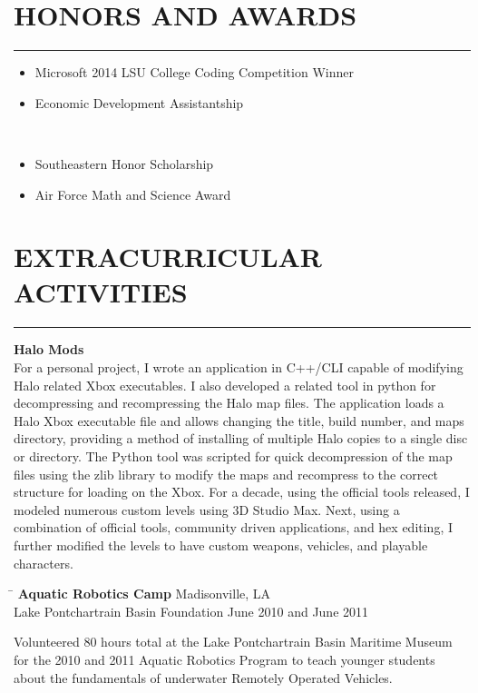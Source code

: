 \documentclass{res}
\begin{document}
\begin{resume}
\section{HONORS AND AWARDS}
	\vspace{0.005in}	
	\rule{\textwidth}{0.5pt}
	\vspace{-0.3in}
		\begin{multicols}{2}
			{
				\begin{itemize}
					\item Microsoft 2014 LSU College Coding Competition Winner
					\item Economic Development Assistantship
				\end{itemize} 
				\ %
				\vspace{-0.175in}
				\begin{itemize}
					\item Southeastern Honor Scholarship
					\item Air Force Math and Science Award
				\end{itemize}
			}
		\end{multicols}	


\section{EXTRACURRICULAR ACTIVITIES}
	\vspace{0.005in}	
	\rule{\textwidth}{0.5pt}
	{\bf Halo Mods}\\
	For a personal project, I wrote an application in C++/CLI capable of modifying Halo related Xbox executables. I also developed a related tool in python for decompressing and recompressing the Halo map files. The application loads a Halo Xbox executable file and allows changing the title, build number, and maps directory, providing a method of installing of multiple Halo copies to a single disc or directory. The Python tool was scripted for quick decompression of the map files using the zlib library to modify the maps and recompress to the correct structure for loading on the Xbox. For a decade, using the official tools released, I modeled numerous custom levels using 3D Studio Max. Next, using a combination of official tools, community driven applications, and hex editing, I further modified the levels to have custom weapons, vehicles, and playable characters.
		
		
	\begin{tabbing}
		\hspace{4.475in}\= \kill %
		{\bf Aquatic Robotics Camp} \> \hspace{0.475in}Madisonville, LA \\
		Lake Pontchartrain Basin Foundation \> June 2010 and June 2011
	\end{tabbing}\vspace{-20pt}
	\vspace{8pt}Volunteered 80 hours total at the Lake Pontchartrain Basin Maritime Museum for the 2010 and 2011 Aquatic Robotics Program to teach younger students about the fundamentals of underwater Remotely Operated Vehicles.
	

\end{resume}
\end{document}

